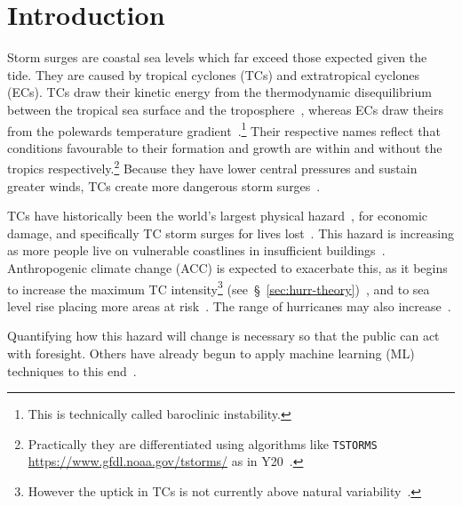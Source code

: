 \section{Introduction}
\label{sec:1_Introduction}


Storm surges are coastal sea levels which far exceed those
expected given the tide.
They are caused by tropical cyclones
(TCs) and extratropical cyclones (ECs).
TCs draw their kinetic energy from the thermodynamic disequilibrium between
the tropical sea surface and the troposphere~\cite{emanuel1986air, emanuel1987dependence},
whereas ECs draw theirs from the
polewards temperature gradient~\cite{lorenz1960energy, holton2004introduction}.\footnote{
This is technically called baroclinic instability.}
Their respective names reflect that conditions favourable
to their formation and growth are within and without the tropics respectively.\footnote{
Practically they are differentiated using algorithms like \texttt{TSTORMS}
\url{https://www.gfdl.noaa.gov/tstorms/} as in Y20~\cite{ZannaPreprint}.}
Because they have lower central pressures and sustain greater winds,
TCs create more dangerous storm surges~\cite{emanuel2005divine}.

TCs have historically been the
world's largest physical hazard~\cite{shultz2005epidemiology},
for economic damage,
and specifically TC storm surges for lives lost~\cite{shultz2005epidemiology,
zhang2009tropical, emanuel2005divine}.
This hazard is increasing as more people live on vulnerable coastlines
in insufficient buildings~\cite{emanuel2005divine}.
Anthropogenic climate change (ACC) is expected to exacerbate this,
as it begins to increase the maximum TC intensity\footnote{
However the uptick in TCs is not currently above
 natural variability~\cite{mendelsohn2012impact}.}
(see~§~\ref{sec:hurr-theory})~\cite{emanuel2008hurricanes,emanuel2017will},
and to sea level rise placing more areas at risk~\cite{SROCC}.
The range of hurricanes may also increase~\cite{fedorov2010tropical}.

Quantifying how this hazard will change is necessary
so that the public can act with foresight.
Others have already begun to apply machine learning (ML) techniques to this
end~\cite{kulp2019new, kulp2018coastaldem, tadesse2020data}.




